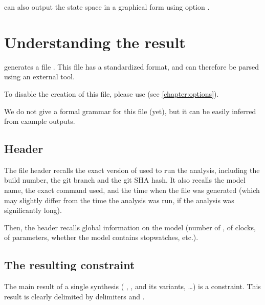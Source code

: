 \imitator{} can also output the state space in a graphical form using option .


\chapter{Understanding the \imitator{} result}\label{chapter:result}

\imitator{} generates a file .
This file has a standardized format, and can therefore be parsed using an external tool.

To disable the creation of this file, please use  (see \cref{chapter:options}).

We do not give a formal grammar for this file (yet), but it can be easily inferred from example outputs.


\section{Header}

The file header recalls the exact version of \imitator{} used to run the analysis, including the build number, the git branch and the git SHA hash.
It also recalls the model name, the exact command used, and the time when the file was generated (which may slightly differ from the time the analysis was run, if the analysis was significantly long).

Then, the header recalls global information on the model (number of \IPTA{}, of clocks, of parameters, whether the model contains stopwatches, etc.).


\section{The resulting constraint}

The main result of a single synthesis (\ie{} \EFsynth{}, \PDFC{}, \IM{} and its variants, \PRP{}…) is a constraint.
This result is clearly delimited by delimiters  and .

